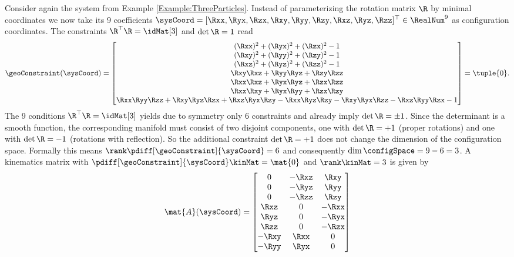 \begin{Example}\label{Example:KinMatSO3}
Consider again the system from Example \ref{Example:ThreeParticles}.
Instead of parameterizing the rotation matrix $\R$ by minimal coordinates we now take its 9 coefficients $\sysCoord = [\Rxx, \Ryx, \Rzx, \Rxy, \Ryy, \Rzy, \Rxz, \Ryz, \Rzz]^\top \in \RealNum^{9}$ as configuration coordinates.
The constraints $\R^\top \R = \idMat[3]$ and $\det\R = 1$ read
\begin{align}\label{eq:constraintSO3}
 \geoConstraint(\sysCoord) = 
  \begin{bmatrix}
  (\Rxx)^2 + (\Ryx)^2 + (\Rzx)^2 - 1 \\
  (\Rxy)^2 + (\Ryy)^2 + (\Rzy)^2 - 1 \\
  (\Rxz)^2 + (\Ryz)^2 + (\Rzz)^2 - 1 \\
  \Rxy \Rxz + \Ryy \Ryz + \Rzy \Rzz \\
  \Rxx \Rxz + \Ryx \Ryz + \Rzx \Rzz \\
  \Rxx \Rxy + \Ryx \Ryy + \Rzx \Rzy \\
  \Rxx \Ryy \Rzz + \Rxy \Ryz \Rzx + \Rxz \Ryx \Rzy - \Rxx \Ryz \Rzy - \Rxy \Ryx \Rzz - \Rxz \Ryy \Rzx - 1
 \end{bmatrix}
 = \tuple{0}.
\end{align}
The 9 conditions $\R^\top \R = \idMat[3]$ yields due to symmetry only 6 constraints and already imply $\det\R = \pm 1$.
Since the determinant is a smooth function, the corresponding manifold must consist of two disjoint components, one with $\det\R = +1$ (proper rotations) and one with $\det\R=-1$ (rotations with reflection).
So the additional constraint $\det\R = +1$ does not change the dimension of the configuration space.
Formally this means $\rank\pdiff[\geoConstraint]{\sysCoord} = 6$ and consequently $\dim\configSpace = 9-6 = 3$.
A kinematics matrix with $\pdiff[\geoConstraint]{\sysCoord} \kinMat = \mat{0}$ and $\rank\kinMat = 3$ is given by
\begin{align}\label{eq:KinMatSO3}
 \mat{A}(\sysCoord) =
 \begin{bmatrix}
  0 & -\Rxz & \Rxy \\
  0 & -\Ryz & \Ryy \\
  0 & -\Rzz & \Rzy \\
  \Rxz & 0 & -\Rxx \\
  \Ryz & 0 & -\Ryx \\
  \Rzz & 0 & -\Rzx \\
  -\Rxy & \Rxx & 0 \\
  -\Ryy & \Ryx & 0 \\

\end{bmatrix}
\end{align}
\end{Example}
